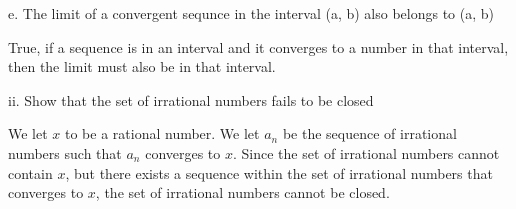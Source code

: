 \documentclass[addpoints]{exam}
\begin{document}
\begin{questions}
e. The limit of a convergent sequnce in the interval (a, b) also belongs to (a, b)

True, if a sequence is in an interval and it converges to a number in that interval, then the limit must
also be in that interval.

ii. Show that the set of irrational numbers fails to be closed

We let $x$ to be a rational number. We let $a_n$ be the sequence of irrational numbers such that 
$a_n$ converges to $x$. Since the set of irrational numbers cannot contain $x$, but there exists a 
sequence within the set of irrational numbers that converges to $x$, the set of irrational numbers
cannot be closed.

\end{questions}
\end{document}
